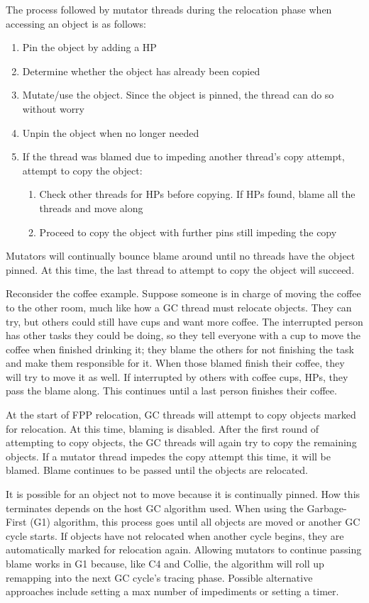 \documentclass{sig-alternate}
\begin{document}
The process followed by mutator threads during the relocation phase when 
accessing an object is as follows:
\begin{enumerate}
\item Pin the object by adding a HP
\item Determine whether the object has already been copied
\item Mutate/use the object. Since the object is pinned, the thread can 
do so without worry
\item Unpin the object when no longer needed
\item If the thread was blamed due to impeding another thread's copy attempt, 
attempt to copy the object:
\begin{enumerate}
\item Check other threads for HPs before copying. If HPs found,
blame all the threads and move along
\item Proceed to copy the object with further pins still impeding the copy
\end{enumerate}
\end{enumerate}
Mutators will continually bounce blame around until
no threads have the object pinned. At this time, the last thread
to attempt to copy the object will succeed.

Reconsider the coffee example. Suppose
someone is in charge of moving the coffee to the other room,
much like how a GC thread must relocate objects. They
can try, but others could still have cups and want more coffee.
The interrupted person has other tasks they could be doing, so they tell
everyone with a cup to move the coffee when finished drinking it;
they blame the others for not finishing the task and make them responsible
for it. When those blamed finish their coffee, they will try to
move it as well. If interrupted by others with coffee cups, HPs, they
pass the blame along. This continues until a last person finishes 
their coffee.

At the start of FPP relocation, GC threads will attempt to copy
objects marked for relocation. At this time, blaming is 
disabled. 
After the first round of attempting to copy objects, the GC threads
will again try to copy the remaining objects. If a mutator 
thread impedes the copy attempt this time, it will be blamed.
Blame continues to be passed until the objects are relocated. 

It is possible for an
object not to move because it is continually pinned. How this terminates 
depends on the host GC algorithm used. When using the Garbage-First (G1) algorithm,
this process goes until all objects are moved or another GC cycle starts.
If objects have not relocated when another cycle begins, they are automatically
marked for relocation again. Allowing mutators to continue passing blame works
in G1 because, like C4 and Collie, the algorithm will roll up remapping into the next
GC cycle's tracing phase. Possible alternative approaches include setting a max number of impediments
or setting a timer.
\end{document}
